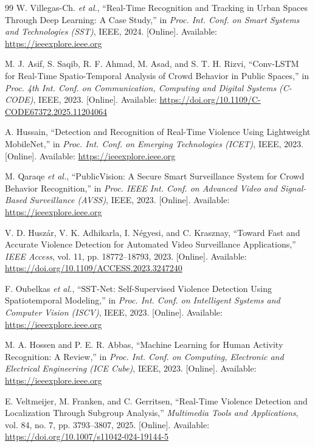 \begin{thebibliography}{99}
W. Villegas-Ch. \textit{et al.}, 
``Real-Time Recognition and Tracking in Urban Spaces Through Deep Learning: A Case Study,'' 
in \textit{Proc. Int. Conf. on Smart Systems and Technologies (SST)}, IEEE, 2024. 
[Online]. Available: \url{https://ieeexplore.ieee.org}

M. J. Asif, S. Saqib, R. F. Ahmad, M. Asad, and S. T. H. Rizvi, 
``{Conv-LSTM} for Real-Time Spatio-Temporal Analysis of Crowd Behavior in Public Spaces,'' 
in \textit{Proc. 4th Int. Conf. on Communication, Computing and Digital Systems (C-CODE)}, IEEE, 2023. 
[Online]. Available: \url{https://doi.org/10.1109/C-CODE67372.2025.11204064}

A. Hussain, 
``Detection and Recognition of Real-Time Violence Using Lightweight {MobileNet},'' 
in \textit{Proc. Int. Conf. on Emerging Technologies (ICET)}, IEEE, 2023. 
[Online]. Available: \url{https://ieeexplore.ieee.org}

M. Qaraqe \textit{et al.}, 
``{PublicVision}: A Secure Smart Surveillance System for Crowd Behavior Recognition,'' 
in \textit{Proc. IEEE Int. Conf. on Advanced Video and Signal-Based Surveillance (AVSS)}, IEEE, 2023. 
[Online]. Available: \url{https://ieeexplore.ieee.org}

V. D. Husz{\'a}r, V. K. Adhikarla, I. N{\'e}gyesi, and C. Krasznay, 
``Toward Fast and Accurate Violence Detection for Automated Video Surveillance Applications,'' 
\textit{IEEE Access}, vol. 11, pp. 18772--18793, 2023. 
[Online]. Available: \url{https://doi.org/10.1109/ACCESS.2023.3247240}

F. Oubelkas \textit{et al.}, 
``{SST-Net}: Self-Supervised Violence Detection Using Spatiotemporal Modeling,'' 
in \textit{Proc. Int. Conf. on Intelligent Systems and Computer Vision (ISCV)}, IEEE, 2023. 
[Online]. Available: \url{https://ieeexplore.ieee.org}

M. A. Hossen and P. E. R. Abbas, 
``Machine Learning for Human Activity Recognition: A Review,'' 
in \textit{Proc. Int. Conf. on Computing, Electronic and Electrical Engineering (ICE Cube)}, IEEE, 2023. 
[Online]. Available: \url{https://ieeexplore.ieee.org}

E. Veltmeijer, M. Franken, and C. Gerritsen, 
``Real-Time Violence Detection and Localization Through Subgroup Analysis,'' 
\textit{Multimedia Tools and Applications}, vol. 84, no. 7, pp. 3793--3807, 2025. 
[Online]. Available: \url{https://doi.org/10.1007/s11042-024-19144-5}


\end{thebibliography}
